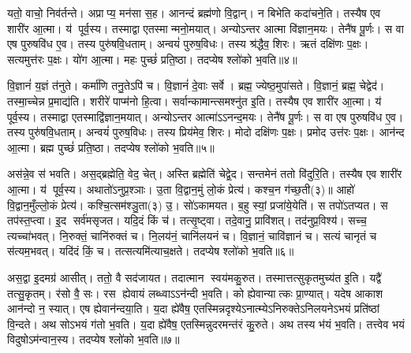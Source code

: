 यतो॒ वाचो॒ निव॑र्तन्ते। अप्राप्य॒ मन॑सा स॒ह। आनन्दं ब्रह्म॑णो वि॒द्वान्। न बिभेति कदा॑चने॒ति। तस्यैष एव शारी॑र आ॒त्मा। य॑ पूर्व॒स्य। तस्माद्वा एतस्मान्मनो॒मयात्। अन्योऽन्तर आत्मा वि॑ज्ञान॒मयः। तेनै॑ष पू॒र्णः। स वा एष पुरुषवि॑ध ए॒व। तस्य पुरु॑षवि॒धताम्। अन्वयं॑ पुरुष॒विधः। तस्य श्र॑द्धैव॒ शिरः। ऋतं दक्षि॑णः प॒क्षः। सत्यमुत्त॑रः प॒क्षः। यो॑ग आ॒त्मा। महः पुच्छं॑ प्रति॒ष्ठा। तदप्येष श्लो॑को भ॒वति॥४॥

वि॒ज्ञानं॑ य॒ज्ञं त॑नुते। कर्मा॑णि तनु॒तेऽपि॑ च। वि॒ज्ञानं॑ दे॒वाः सर्वे। ब्रह्म॒ ज्येष्ठ॒मुपा॑सते। वि॒ज्ञानं॒ ब्रह्म॒ चेद्वेद॑। तस्मा॒च्चेन्न प्र॒माद्य॑ति। शरीरे॑ पाप्म॑नो हि॒त्वा। सर्वान्कामान्त्समश्नु॑त इ॒ति। तस्यैष एव शारी॑र आ॒त्मा। य॑ पूर्व॒स्य। तस्माद्वा एतस्माद्वि॑ज्ञान॒मयात्। अन्योऽन्तर आत्मा॑ऽऽनन्द॒मयः। तेनै॑ष पू॒र्णः। स वा एष पुरुषवि॑ध ए॒व। तस्य पुरु॑षवि॒धताम्। अन्वयं॑ पुरुष॒विधः। तस्य प्रिय॑मेव॒ शिरः। मोदो दक्षि॑णः प॒क्षः। प्रमोद उत्त॑रः प॒क्षः। आन॑न्द आ॒त्मा। ब्रह्म पुच्छं॑ प्रति॒ष्ठा। तदप्येष श्लो॑को भ॒वति॥५॥

अस॑न्ने॒व स॑ भवति। अस॒द्ब्रह्मेति॒ वेद॒ चेत्। अस्ति ब्रह्मेति॑ चेद्वे॒द। सन्तमेनं ततो वि॑दुरि॒ति। तस्यैष एव शारी॑र आ॒त्मा। य॑ पूर्व॒स्य। अथातो॑ऽनुप्र॒श्ञाः। उ॒ता वि॒द्वान॒मुं लो॒कं प्रेत्य॑। कश्च॒न ग॑च्छ॒ती(३)॥ आहो॑ वि॒द्वान॒मुँल्लो॒कं प्रेत्य॑। कश्चि॒त्सम॑श्ञु॒ता(३) उ॒। सो॑ऽकामयत। ब॒हु स्यां॒ प्रजा॑ये॒येति॑। स तपो॑ऽतप्यत। स तप॑स्त॒प्त्वा। इ॒द सर्व॑मसृजत। यदि॒दं किं च॑। तत्सृ॒ष्ट्वा। तदे॒वानु॒ प्रावि॑शत्। तद॑नुप्र॒विश्य॑। सच्च॒ त्यच्चा॑भवत्। नि॒रुक्तं॒ चानि॑रुक्तं च। नि॒लय॑नं॒ चानि॑लयनं च। वि॒ज्ञानं॒ चावि॑ज्ञानं च। सत्यं चानृतं च स॑त्यम॒भवत्। यदि॑दं किं॒ च। तत्सत्यमि॑त्याच॒क्षते। तदप्येष श्लो॑को भ॒वति॥६॥

अस॒द्वा इ॒दमग्र॑ आसीत्। ततो॒ वै सद॑जायत। तदात्मान स्वय॑मकु॒रुत। तस्मात्तत्सुकृतमुच्य॑त इ॒ति। यद्वै॑ तत्सु॒कृतम्। र॑सो वै॒ सः। रस ह्येवायं लब्ध्वाऽऽन॑न्दी भ॒वति। को ह्येवान्यात्कः प्रा॒ण्यात्। यदेष आकाश आन॑न्दो न॒ स्यात्। एष ह्येवान॑न्दया॒ति। य॒दा ह्ये॑वैष॒ एतस्मिन्नदृश्येऽनात्म्येऽनिरुक्तेऽनिलयनेऽभयं प्रति॑ष्ठां  वि॒न्दते। अथ सोऽभयं ग॑तो भ॒वति। य॒दा ह्ये॑वैष॒ एतस्मिन्नुदरमन्त॑रं कु॒रुते। अथ तस्य भ॑यं भ॒वति। तत्त्वेव भयं  विदुषोऽम॑न्वान॒स्य। तदप्येष श्लो॑को भ॒वति॥७॥

